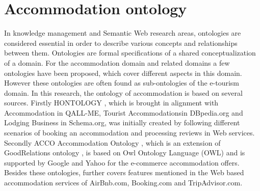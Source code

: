\section{Accommodation ontology} 
In knowledge management and Semantic Web research areas, ontologies are considered essential in order to describe various concepts and relationships between them. Ontologies are formal specifications of a shared conceptualization of a domain. For the accommodation domain and related domains a few ontologies have been proposed, which cover different aspects in this domain. However these ontologies are often found as sub-ontologies of the e-tourism domain. In this research, the ontology of accommodation is based on several sources. Firstly HONTOLOGY \cite{chaves2012hontology}, which is brought in alignment with Accommodation in QALL-ME, Tourist Accommodationsin DBpedia.org and Lodging Business  in Schema.org, was initially created by following different scenarios of booking an accommodation and processing reviews in Web services. Secondly ACCO Accommodation Ontology \cite{hepp2013accommodation}, which is an extension of GoodRelations ontology \cite{hepp2008goodrelations}, is based on Owl Ontology Language (OWL) and is supported by Google and Yahoo for the e-commerce accommodation offers.
Besides these ontologies,  further covers features mentioned in the Web based accommodation services of AirBnb.com, Booking.com and TripAdvisor.com.

